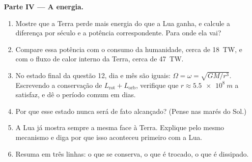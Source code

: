 \begin{problem}
\medskip
\noindent\textbf{Parte IV --- A energia.}
\begin{enumerate}[resume]
  \item Mostre que a Terra perde mais energia do que a Lua ganha, e
        calcule a diferença por século e a potência correspondente.
        Para onde ela vai?
  \item Compare essa potência com o consumo da humanidade, cerca de
        \qty{18}{TW}, e com o fluxo de calor interno da Terra, cerca de
        \qty{47}{TW}.
  \item No estado final da questão 12, dia e mês são iguais:
        $\Omega = \omega = \sqrt{GM/r^3}$. Escrevendo a conservação de
        $L_{\text{rot}} + L_{\text{orb}}$, verifique que $r \approx
        \qty{5.5e8}{m}$ a satisfaz, e dê o período comum em dias.
  \item Por que esse estado nunca será de fato alcançado? (Pense nas
        marés do Sol.)
  \item A Lua já mostra sempre a mesma face à Terra. Explique pelo mesmo
        mecanismo e diga por que isso aconteceu primeiro com a Lua.
  \item Resuma em três linhas: o que se conserva, o que é trocado,
        o que é dissipado.
\end{enumerate}
\end{problem}
